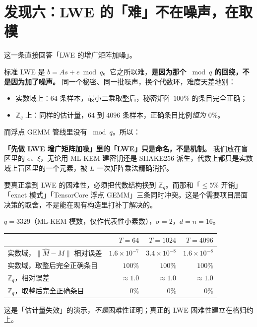 \documentclass[UTF8, fontset=macnew, 11pt]{ctexart}
\begin{document}
\section{发现六：LWE 的「难」不在噪声，在取模}

\begin{plainbox}
这一条直接回答「LWE 的增广矩阵加噪」。

标准 LWE 是 $b=As+e \bmod q$。它之所以难，\textbf{是因为那个 $\bmod q$ 的回绕，不是因为加了噪声。} 同一个秘密、同一批噪声，换个代数环，难度天差地别：
\begin{itemize}
  \item 实数域上：$64$ 条样本，最小二乘取整后，秘密矩阵 $100\%$ 的条目完全正确；
  \item $\mathbb Z_q$ 上：同样的估计量，$64$ 到 $4096$ 条样本，正确条目比例\emph{恒为} $0\%$。
\end{itemize}

而浮点 GEMM 管线里没有 $\bmod q$。所以：

\textbf{「先做 LWE 增广矩阵加噪」里的「LWE」只是命名，不是机制。} 我们放在盲区里的 $e$、$\xi$，无论用 ML-KEM 建密钥还是 SHAKE256 派生，代数上都只是实数域上盲区里的一个元素，被 $L$ 一次矩阵乘法精确消掉。

要真正拿到 LWE 的困难性，必须把代数结构换到 $\mathbb Z_q$。而那和「$\le 5\%$ 开销」「exact 模式」「TensorCore 浮点 GEMM」三条同时冲突。这是个需要项目层面决策的取舍，不是能在现有构造里打补丁解决的。
\end{plainbox}

\begin{numbox}
$q=3329$（ML-KEM 模数，仅作代表性小素数），$\sigma=2$，$d=n=16$。

\begin{tabular}{@{}lrrr@{}}
\toprule
& $T=64$ & $T=1024$ & $T=4096$ \\
\midrule
实数域，$\|\hat M-M\|$ 相对误差 & $1.6\times10^{-7}$ & $3.4\times10^{-8}$ & $1.6\times10^{-8}$ \\
实数域，取整后完全正确条目 & $100\%$ & $100\%$ & $100\%$ \\
$\mathbb Z_q$，相对误差 & $\approx1.0$ & $\approx1.0$ & $\approx1.0$ \\
$\mathbb Z_q$，取整后完全正确条目 & $0\%$ & $0\%$ & $0\%$ \\
\bottomrule
\end{tabular}

\smallskip
这是「估计量失效」的演示，\emph{不是}困难性证明；真正的 LWE 困难性建立在格归约上。
\end{numbox}
\end{document}
